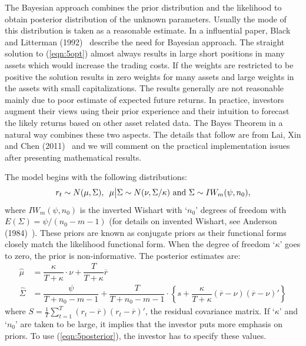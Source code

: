 The Bayesian approach combines the prior distribution and the likelihood to obtain posterior distribution of the unknown parameters. Usually the mode of this distribution is taken as a reasonable estimate. In a influential paper, Black and Litterman (1992)~\cite{blacklit} describe the need for Bayesian approach. The straight solution to (\ref{eqn:5opt}) almost always results in large short positions in many assets which would increase the trading costs. If the weights are restricted to be positive the solution results in zero weights for many assets and large weights in the assets with small capitalizations. The results generally are not reasonable mainly due to poor estimate of expected future returns. In practice, investors augment their views using their prior experience and their intuition to forecast the likely returns based on other asset related data. The Bayes Theorem in a natural way combines these two aspects. The details that follow are from Lai, Xin and Chen (2011)~\cite{laixingchen} and we will comment on the practical implementation issues after presenting mathematical results. 


The model begins with the following distributions:
	\begin{equation}\label{eqn:5distributions}
	r_t \sim N(\mu,\Sigma), \enskip \mu \big| \Sigma \sim N(\nu, \Sigma/\kappa) \text{ and } \Sigma \sim IW_m(\psi,n_0),
	\end{equation}
where $IW_m(\psi,n_0)$ is the inverted Wishart with `$n_0$' degrees of freedom with $E(\Sigma)=\psi/(n_0-m-1)$ (for details on invented Wishart, see Anderson (1984)~\cite{andersontw2}). These priors are known as conjugate priors as their functional forms closely match the likelihood functional form. When the degree of freedom `$\kappa$' goes to zero, the prior is non-informative. The posterior estimates are:
	\begin{equation}\label{eqn:5posterior}
	\begin{split}
	\hat{\mu}&= \dfrac{\kappa}{T+\kappa} \cdot \nu + \dfrac{T}{T+\kappa} \overline{r} \\
	\hat{\Sigma}&= \dfrac{\psi}{T+n_0-m-1} + \dfrac{T}{T+n_0-m-1} \cdot \left\{s+ \dfrac{\kappa}{T+\kappa} (\overline{r}-\nu)(\overline{r}-\nu)' \right\}
	\end{split}
	\end{equation}
where $S=\frac{1}{T} \sum_{t=1}^T (r_t-\overline{r})(r_t-\overline{r})'$, the residual covariance matrix. If `$\kappa$' and `$n_0$' are taken to be large, it implies that the investor puts more emphasis on priors. To use (\ref{eqn:5posterior}), the investor has to specify these values. 



